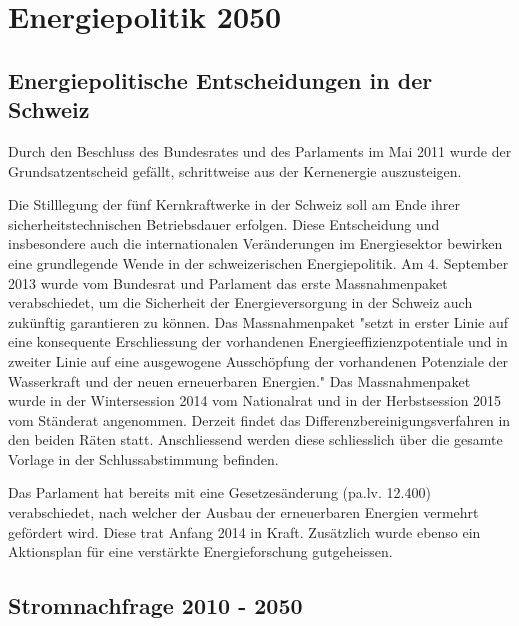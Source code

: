 \chapter{Energiepolitik 2050}



\section{Energiepolitische Entscheidungen in der Schweiz\cite{bfe_energiestrategie}}
Durch den Beschluss des Bundesrates und des Parlaments im Mai 2011 wurde der Grundsatzentscheid gefällt,
schrittweise aus der Kernenergie auszusteigen. 
\par
Die Stilllegung der fünf Kernkraftwerke in der Schweiz soll am Ende ihrer sicherheitstechnischen
Betriebsdauer erfolgen. Diese Entscheidung und insbesondere auch die internationalen Veränderungen 
im Energiesektor bewirken eine grundlegende Wende in der schweizerischen Energiepolitik.
Am 4. September 2013 wurde vom Bundesrat und Parlament das erste Massnahmenpaket verabschiedet, um
die Sicherheit der Energieversorgung in der Schweiz auch zukünftig garantieren zu können. Das Massnahmenpaket "setzt in erster
Linie auf eine konsequente Erschliessung der vorhandenen Energieeffizienzpotentiale und in zweiter Linie auf eine ausgewogene Ausschöpfung der vorhandenen Potenziale der Wasserkraft und der neuen erneuerbaren Energien." Das Massnahmenpaket wurde in der Wintersession 2014 vom Nationalrat und in der Herbstsession 2015 vom Ständerat
angenommen. Derzeit findet das Differenzbereinigungsverfahren in den beiden Räten statt. Anschliessend werden diese schliesslich über die gesamte Vorlage in der Schlussabstimmung befinden. 
\par
Das Parlament hat bereits mit eine Gesetzesänderung (pa.lv. 12.400) verabschiedet, nach welcher der Ausbau der erneuerbaren Energien vermehrt gefördert wird. Diese trat Anfang 2014 in Kraft. Zusätzlich wurde ebenso ein Aktionsplan für eine verstärkte Energieforschung gutgeheissen.

\section{Stromnachfrage 2010 - 2050\cite{eth_energiezukunft_schweiz}}

